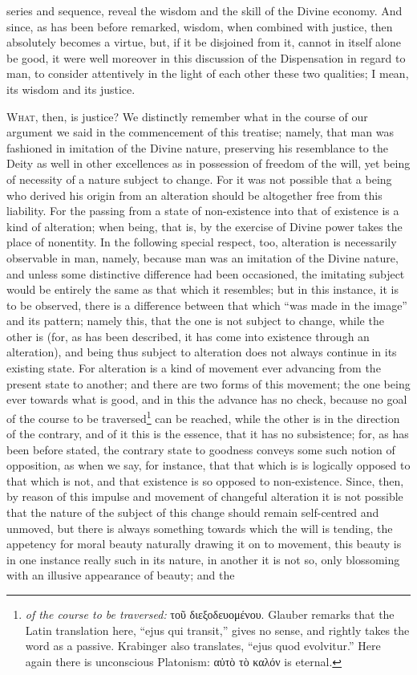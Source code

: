 series and sequence, reveal the wisdom and the skill of the Divine economy. And since, as has been before remarked, wisdom, when combined with justice, then absolutely becomes a virtue, but, if it be disjoined from it, cannot in itself alone be good, it were well moreover in this discussion of the Dispensation in regard to man, to consider attentively in the light of each other these two qualities; I mean, its wisdom and its justice.


\textsc{What}, then, is justice? We distinctly remember what in the course of our argument we said in the commencement of this treatise; namely, that man was fashioned in imitation of the Divine nature, preserving his resemblance to the Deity as well in other excellences as in possession of freedom of the will, yet being of necessity of a nature subject to change. For it was not possible that a being who derived his origin from an alteration should be altogether free from this liability. For the passing from a state of non-existence into that of existence is a kind of alteration; when being, that is, by the exercise of Divine power takes the place of nonentity. In the following special respect, too, alteration is necessarily observable in man, namely, because man was an imitation of the Divine nature, and unless some distinctive difference had been occasioned, the imitating subject would be entirely the same as that which it resembles; but in this instance, it is to be observed, there is a difference between that which “was made in the image” and its pattern; namely this, that the one is not subject to change, while the other is (for, as has been described, it has come into existence through an alteration), and being thus subject to alteration does not always continue in its existing state. For alteration is a kind of movement ever advancing from the present state to another; and there are two forms of this movement; the one being ever towards what is good, and in this the advance has no check, because no goal of the course to be traversed\footnote{\emph{of the course to be traversed:} \textgreek{τοῦ διεξοδευομένου}. Glauber remarks that the Latin translation here, “ejus qui transit,” gives no sense, and rightly takes the word as a passive. Krabinger also translates, “ejus quod evolvitur.” Here again there is unconscious Platonism: \textgreek{αὐτὸ τὸ καλόν} is eternal.} can be reached, while the other is in the direction of the contrary, and of it this is the essence, that it has no subsistence; for, as has been before stated, the contrary state to goodness conveys some such notion of opposition, as when we say, for instance, that that which is is logically opposed to that which is not, and that existence is so opposed to non-existence. Since, then, by reason of this impulse and movement of changeful alteration it is not possible that the nature of the subject of this change should remain self-centred and unmoved, but there is always something towards which the will is tending, the appetency for moral beauty naturally drawing it on to movement, this beauty is in one instance really such in its nature, in another it is not so, only blossoming with an illusive appearance of beauty; and the 